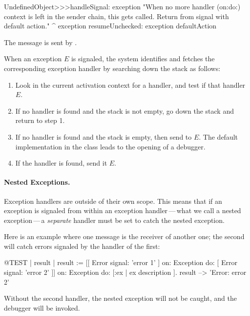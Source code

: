 \documentclass[a4paper,10pt,twoside]{book}
\begin{document}
\begin{code}{}
UndefinedObject>>>handleSignal: exception
	"When no more handler (on:do:) context is left in the sender chain, this gets called.  Return from signal with default action."
	^ exception resumeUnchecked: exception defaultAction
\end{code}

The message  is sent by . 

When an exception $E$ is signaled, the system identifies and fetches the corresponding exception handler by searching down the stack as follows:

\begin{enumerate}

\item Look in the current activation context for a handler, and test if that handler  $E$.

\item If no handler is found and the stack is not empty, go down the stack and return to step 1.

\item If no handler is found and the stack is empty, then send  to $E$. The default implementation in the  class leads to the opening of a debugger.

\item If the handler is found, send it  $E$.

\end{enumerate}

\paragraph{Nested Exceptions.}
Exception handlers are outside of their own scope.  This means that if an exception is signaled from within an exception handler\,---\,what we call a nested exception\,---\,a \emph{separate} handler must be set to catch the nested exception.

Here is an example where one  message is the receiver of another one; the second will catch errors signaled by the handler of the first:
\begin{code}{@TEST | result |}
result := [[ Error signal: 'error 1' ]
	on: Exception
	do: [ Error signal: 'error 2' ]]
		on: Exception
		do: [:ex | ex description ].
result --> 'Error: error 2'
\end{code}

Without the second handler, the nested exception will not be caught, and the debugger will be invoked.
\end{document}
